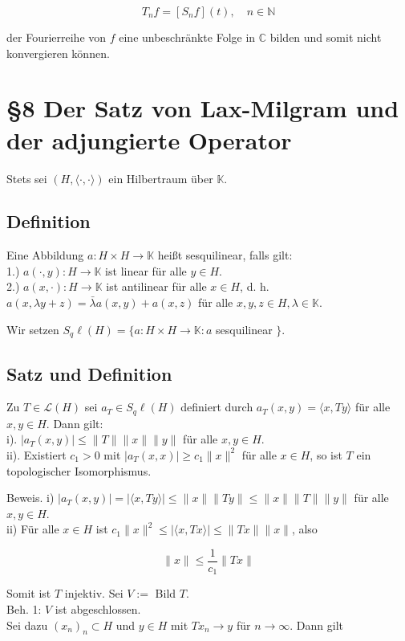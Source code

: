 \documentclass[10pt, letterpaper]{article}
\begin{document}
$$
T_{n} f=\left[S_{n} f\right](t), \quad n \in \mathbb{N}
$$

der Fourierreihe von $f$ eine unbeschränkte Folge in $\mathbb{C}$ bilden und somit nicht konvergieren können.

\section*{§8 Der Satz von Lax-Milgram und der adjungierte Operator}
Stets sei $(H,\langle\cdot, \cdot\rangle)$ ein Hilbertraum über $\mathbb{K}$.

\subsection*{Definition}
Eine Abbildung $a: H \times H \rightarrow \mathbb{K}$ heißt sesquilinear, falls gilt:\\
1.) $a(\cdot, y): H \rightarrow \mathbb{K}$ ist linear für alle $y \in H$.\\
2.) $a(x, \cdot): H \rightarrow \mathbb{K}$ ist antilinear für alle $x \in H$, d. h. $a(x, \lambda y+z)=\bar{\lambda} a(x, y)+ a(x, z)$ für alle $x, y, z \in H, \lambda \in \mathbb{K}$.

Wir setzen $S_{q} \ell(H)=\{a: H \times H \rightarrow \mathbb{K}: a$ sesquilinear $\}$.

\subsection*{Satz und Definition}
Zu $T \in \mathcal{L}(H)$ sei $a_{T} \in S_{q} \ell(H)$ definiert durch $a_{T}(x, y)=\langle x, T y\rangle$ für alle $x, y \in H$. Dann gilt:\\
i). $\left|a_{T}(x, y)\right| \leq\|T\|\|x\|\|y\|$ für alle $x, y \in H$.\\
ii). Existiert $c_{1}>0$ mit $\left|a_{T}(x, x)\right| \geq c_{1}\|x\|^{2}$ für alle $x \in H$, so ist $T$ ein topologischer Isomorphismus.

Beweis. i) $\left|a_{T}(x, y)\right|=|\langle x, T y\rangle| \leq\|x\|\|T y\| \leq\|x\|\|T\|\|y\|$ für alle $x, y \in H$.\\
ii) Für alle $x \in H$ ist $c_{1}\|x\|^{2} \leq|\langle x, T x\rangle| \leq\|T x\|\|x\|$, also

$$
\|x\| \leq \frac{1}{c_{1}}\|T x\|
$$

Somit ist $T$ injektiv. Sei $V:=$ Bild $T$.\\
Beh. 1: $V$ ist abgeschlossen.\\
Sei dazu $\left(x_{n}\right)_{n} \subset H$ und $y \in H$ mit $T x_{n} \rightarrow y$ für $n \rightarrow \infty$. Dann gilt
\end{document}
